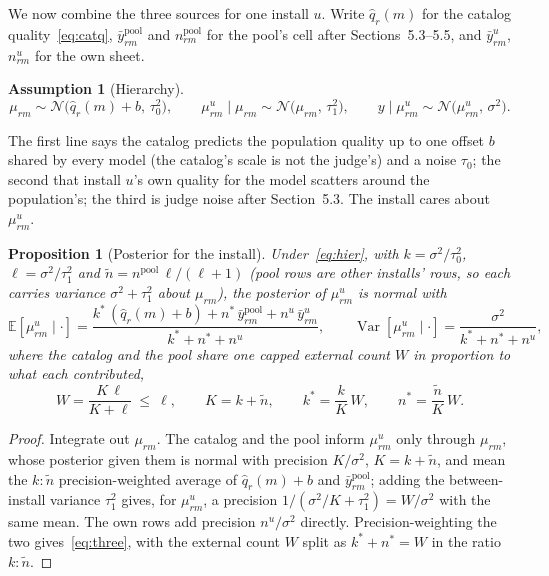 \documentclass[10pt,a4paper]{article}
\newcommand{\E}{\mathbb{E}}
\newtheorem{proposition}{Proposition}
\theoremstyle{definition}
\newtheorem{assumption}{Assumption}
\theoremstyle{remark}
\begin{document}
We now combine the three sources for one install $u$. Write $\hat q_r(m)$ for the catalog quality~\eqref{eq:catq}, $\bar y^{\mathrm{pool}}_{rm}$ and $n^{\mathrm{pool}}_{rm}$ for the pool's cell after Sections~5.3--5.5, and $\bar y^{u}_{rm}$, $n^{u}_{rm}$ for the own sheet.

\begin{assumption}[Hierarchy]
\begin{equation}
\mu_{rm}\sim\mathcal N\big(\hat q_r(m)+b,\,\tau_0^2\big),\qquad
\mu^{u}_{rm}\mid\mu_{rm}\sim\mathcal N\big(\mu_{rm},\,\tau_1^2\big),\qquad
y\mid\mu^{u}_{rm}\sim\mathcal N\big(\mu^{u}_{rm},\,\sigma^2\big).
\label{eq:hier}
\end{equation}
\end{assumption}
The first line says the catalog predicts the population quality up to one offset $b$ shared by every model (the catalog's scale is not the judge's) and a noise $\tau_0$; the second that install $u$'s own quality for the model scatters around the population's; the third is judge noise after Section~5.3. The install cares about $\mu^u_{rm}$.

\begin{proposition}[Posterior for the install]
\label{prop:post}
Under~\eqref{eq:hier}, with $k=\sigma^2/\tau_0^2$, $\ell=\sigma^2/\tau_1^2$ and $\tilde n=n^{\mathrm{pool}}\,\ell/(\ell+1)$ (pool rows are other installs' rows, so each carries variance $\sigma^2+\tau_1^2$ about $\mu_{rm}$), the posterior of $\mu^u_{rm}$ is normal with
\begin{equation}
\E[\mu^u_{rm}\mid\cdot]=\frac{k^{\ast}\,(\hat q_r(m)+b) + n^{\ast}\,\bar y^{\mathrm{pool}}_{rm} + n^u\,\bar y^u_{rm}}{k^{\ast}+n^{\ast}+n^u},\qquad
\operatorname{Var}[\mu^u_{rm}\mid\cdot]=\frac{\sigma^2}{k^{\ast}+n^{\ast}+n^u},
\label{eq:three}
\end{equation}
where the catalog and the pool share one \emph{capped} external count $W$ in proportion to what each contributed,
\begin{equation}
W=\frac{K\,\ell}{K+\ell}\ \le\ \ell,\qquad K=k+\tilde n,\qquad
k^{\ast}=\frac{k}{K}\,W,\qquad n^{\ast}=\frac{\tilde n}{K}\,W .
\label{eq:cap}
\end{equation}
\end{proposition}
\begin{proof}
Integrate out $\mu_{rm}$. The catalog and the pool inform $\mu^u_{rm}$ only through $\mu_{rm}$, whose posterior given them is normal with precision $K/\sigma^2$, $K=k+\tilde n$, and mean the $k:\tilde n$ precision-weighted average of $\hat q_r(m)+b$ and $\bar y^{\mathrm{pool}}_{rm}$; adding the between-install variance $\tau_1^2$ gives, for $\mu^u_{rm}$, a precision $1/(\sigma^2/K+\tau_1^2)=W/\sigma^2$ with the same mean. The own rows add precision $n^u/\sigma^2$ directly. Precision-weighting the two gives~\eqref{eq:three}, with the external count $W$ split as $k^{\ast}+n^{\ast}=W$ in the ratio $k:\tilde n$.
\end{proof}
\end{document}
